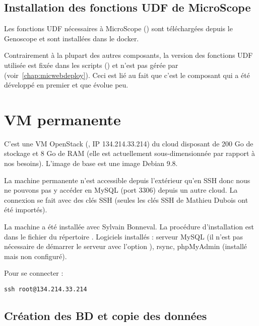 \subsection{Installation des fonctions UDF de MicroScope}

Les fonctions UDF nécessaires à MicroScope ()
sont téléchargées depuis le Genoscope et
sont installées dans le docker.

\begin{warningbox}
    Contrairement à la plupart des autres composants, la version des fonctions UDF utilisée
    est fixée dans les scripts (\micUDFVersion) et n'est pas gérée par \micWEBdeployVer{} (voir~\autoref{chap:micwebdeploy}).
    Ceci est lié au fait que c'est le composant qui a été développé en premier
    et que  évolue peu.
\end{warningbox}

\section{VM permanente}\label{VMpermanente}

C'est une VM OpenStack (, IP 134.214.33.214) du cloud  disposant de 200 Go de stockage et 8 Go de RAM (elle est actuellement sous-dimensionnée par rapport à nos besoins).
L'image de base est une image Debian 9.8.

La machine permanente n'est accessible depuis l'extérieur qu'en SSH donc nous ne pouvons pas y accéder en MySQL (port 3306) depuis un autre cloud.
La connexion se fait avec des clés SSH (seules les clés SSH de Mathieu Dubois ont été importés).

La machine a été installée avec Sylvain Bonneval.
La procédure d'installation est dans le fichier  du répertoire .
Logiciels installés : serveur MySQL (il n'est pas nécessaire de démarrer le serveur avec l'option ), rsync, phpMyAdmin (installé mais non configuré).

Pour se connecter :
\begin{lstlisting}[style=bash]
ssh root@134.214.33.214
\end{lstlisting}

\subsection{Création des BD et copie des données}

